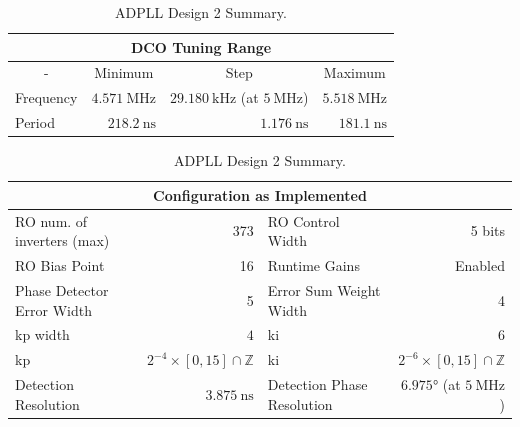 \begin{table}[!h]
    \begin{center}
        \begin{tabular}{|l|r|r|r|}
            \multicolumn{4}{c}{\ac{DCO} Tuning Range} \T\\
            \hline
            \multicolumn{1}{|c|}{-} & \multicolumn{1}{c|}{Minimum} & \multicolumn{1}{c|}{Step} & \multicolumn{1}{c|}{Maximum} \T\\
            \hline
            Frequency & $4.571~\si{\mega\hertz}$ & $29.180~\si{\kilo\hertz}$ (at $5~\si{\mega\hertz}$) & $5.518~\si{\mega\hertz}$ \T\\
            \hline
            Period & $218.2~\si{\nano\second}$ & $1.176~\si{\nano\second}$ & $181.1~\si{\nano\second}$ \T\\
            \hline
        \end{tabular}
        \begin{tabular}{|l|r|l|r|}
            \multicolumn{4}{c}{Configuration as Implemented} \T\\
            \hline
            \ac{RO} num. of inverters (max) & 373 & \ac{RO} Control Width & 5 bits \T\\
            \hline
            \ac{RO} Bias Point & 16 & Runtime Gains & Enabled \T\\
            \hline
            Phase Detector Error Width & 5 & Error Sum Weight Width & 4 \T\\
            \hline
            \acs{kp} width & $4$ & \acs{ki} & $6$ \T\\
            \hline
            \acs{kp} & $2^{-4}\times[0,15]\cap\mathbb{Z}$ & \acs{ki} & $2^{-6}\times[0,15]\cap\mathbb{Z}$ \T\\
            \hline
            Detection Resolution & $3.875~\si{\nano\second}$ & Detection Phase Resolution & $6.975\si{\degree}$ (at $5~\si{\mega\hertz}$)\\
            \hline
        \end{tabular}
    \end{center}
    \caption[\acs{ADPLL} Design 2 Summary]{\acs{ADPLL} Design 2 Summary.}
    \label{table:adpll2}
\end{table}


